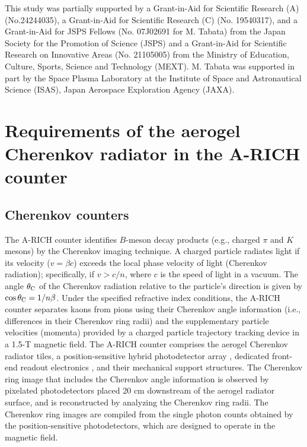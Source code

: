 \documentclass[5p,twocolumn]{elsarticle}
\begin{document}
This study was partially supported by a Grant-in-Aid for Scientific Research (A) (No.24244035), a Grant-in-Aid for Scientific Research (C) (No. 19540317), and a Grant-in-Aid for JSPS Fellows (No. 07J02691 for M. Tabata) from the Japan Society for the Promotion of Science (JSPS) and a Grant-in-Aid for Scientific Research on Innovative Areas (No. 21105005) from the Ministry of Education, Culture, Sports, Science and Technology (MEXT). M. Tabata was supported in part by the Space Plasma Laboratory at the Institute of Space and Astronautical Science (ISAS), Japan Aerospace Exploration Agency (JAXA).


\appendix

\section{Requirements of the aerogel Cherenkov radiator in the A-RICH counter}
\label{app}

\subsection{Cherenkov counters}
\label{s1}

The A-RICH counter identifies $B$-meson decay products (e.g., charged $\pi $ and $K$ mesons) by the Cherenkov imaging technique. A charged particle radiates light if its velocity ($v = \beta c$) exceeds the local phase velocity of light (Cherenkov radiation); specifically, if $v > c/n$, where $c$ is the speed of light in a vacuum. The angle $\theta_{\rm {C}}$ of the Cherenkov radiation relative to the particle's direction is given by $\cos \theta_{\rm {C}} = 1/n\beta $. Under the specified refractive index conditions, the A-RICH counter separates kaons from pions using their Cherenkov angle information (i.e., differences in their Cherenkov ring radii) and the supplementary particle velocities (momenta) provided by a charged particle trajectory tracking device \cite{citeS1} in a 1.5-T magnetic field. The A-RICH counter comprises the aerogel Cherenkov radiator tiles, a position-sensitive hybrid photodetector array \cite{citeS2}, dedicated front-end readout electronics \cite{citeS3}, and their mechanical support structures. The Cherenkov ring image that includes the Cherenkov angle information is observed by pixelated photodetectors placed 20 cm downstream of the aerogel radiator surface, and is reconstructed by analyzing the Cherenkov ring radii. The Cherenkov ring images are compiled from the single photon counts obtained by the position-sensitive photodetectors, which are designed to operate in the magnetic field.
\end{document}
